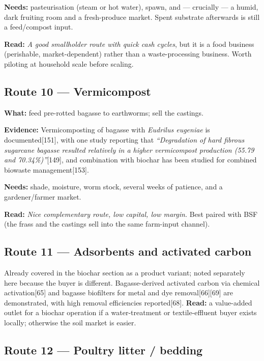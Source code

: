\documentclass[11pt]{article}
\newcommand{\src}[1]{[#1]}
\begin{document}
\textbf{Needs:} pasteurisation (steam or hot water), spawn, and --- crucially ---
a humid, dark fruiting room and a fresh-produce market. Spent substrate
afterwards is still a feed/compost input.

\textbf{Read:} \emph{A good smallholder route with quick cash cycles}, but it is
a food business (perishable, market-dependent) rather than a
waste-processing business. Worth piloting at household scale before scaling.

\subsection{Route 10 --- Vermicompost}

\textbf{What:} feed pre-rotted bagasse to earthworms; sell the castings.

\textbf{Evidence:} Vermicomposting of bagasse with \emph{Eudrilus eugeniae} is
documented\src{151}, with one study reporting that \emph{``Degradation of hard
fibrous sugarcane bagasse resulted relatively in a higher vermicompost
production (55.79 and 70.34\%)''}\src{149}, and combination with biochar has
been studied for combined biowaste management\src{153}.

\textbf{Needs:} shade, moisture, worm stock, several weeks of patience, and a
gardener/farmer market.

\textbf{Read:} \emph{Nice complementary route, low capital, low margin.} Best
paired with BSF (the frass and the castings sell into the same farm-input
channel).

\subsection{Route 11 --- Adsorbents and activated carbon}

Already covered in the biochar section as a product variant; noted separately
here because the buyer is different. Bagasse-derived activated carbon via
chemical activation\src{65} and bagasse biofilters for metal and dye
removal\src{66}\src{69} are demonstrated, with high removal efficiencies
reported\src{68}. \textbf{Read:} a value-added outlet for a biochar operation
if a water-treatment or textile-effluent buyer exists locally; otherwise the
soil market is easier.

\subsection{Route 12 --- Poultry litter / bedding}
\end{document}
